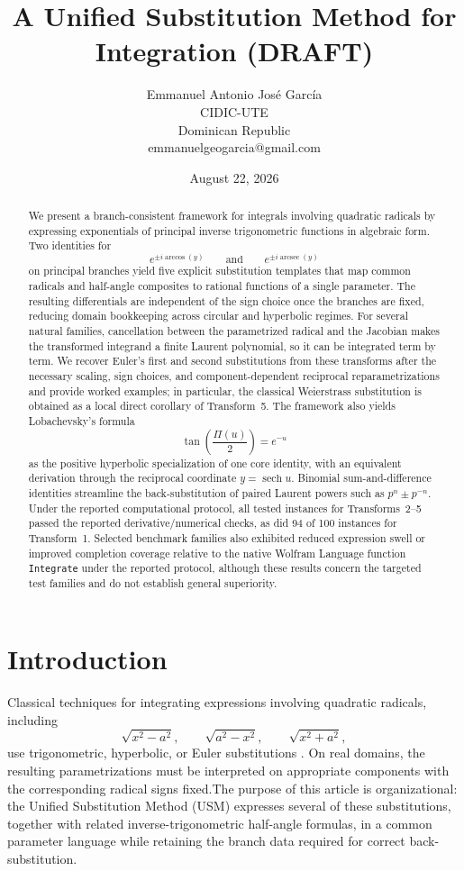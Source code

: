 \documentclass[11pt]{article}
\title{A Unified Substitution Method for Integration (DRAFT)}
\author{Emmanuel Antonio José García\\CIDIC-UTE\\Dominican Republic\\emmanuelgeogarcia@gmail.com}
\date{August 22, 2026}
\theoremstyle{remark}
\DeclareMathOperator{\arcsec}{arcsec}
\DeclareMathOperator{\sech}{sech}
\begin{document}
\maketitle

\begin{abstract}
We present a branch-consistent framework for integrals involving quadratic radicals by expressing exponentials of principal inverse trigonometric functions in algebraic form. Two identities for
\[
e^{\pm i\arccos(y)}
\qquad\text{and}\qquad
e^{\pm i\arcsec(y)}
\]
on principal branches yield five explicit substitution templates that map common radicals and half-angle composites to rational functions of a single parameter. The resulting differentials are independent of the sign choice once the branches are fixed, reducing domain bookkeeping across circular and hyperbolic regimes. For several natural families, cancellation between the parametrized radical and the Jacobian makes the transformed integrand a finite Laurent polynomial, so it can be integrated term by term. We recover Euler's first and second substitutions from these transforms
after the necessary scaling, sign choices, and component-dependent
reciprocal reparametrizations and provide worked examples; in particular,
the classical Weierstrass substitution is obtained as a local direct
corollary of Transform~5. The framework also yields Lobachevsky's formula
\[
\tan\!\left(\frac{\Pi(u)}{2}\right)=e^{-u}
\]
as the positive hyperbolic specialization of one core identity, with an equivalent derivation through the reciprocal coordinate \(y=\sech u\). Binomial sum-and-difference identities streamline the back-substitution of paired Laurent powers such as \(p^n\pm p^{-n}\). Under the reported computational protocol, all tested instances for Transforms~2--5 passed the reported derivative/numerical checks, as did 94 of 100 instances for Transform~1. Selected benchmark families also exhibited reduced expression swell or improved completion coverage relative to the native Wolfram Language function \texttt{Integrate} under the reported protocol, although these results concern the targeted test families and do not establish general superiority.
\end{abstract}

\section{Introduction}

Classical techniques for integrating expressions involving quadratic
radicals, including
\[
\sqrt{x^2-a^2},\qquad \sqrt{a^2-x^2},\qquad \sqrt{x^2+a^2},
\]
use trigonometric, hyperbolic, or Euler substitutions
\cite{Hardy,Kishan,Piskunov}. On real domains, the resulting
parametrizations must be interpreted on appropriate components with
the corresponding radical signs fixed.The purpose of this article is organizational: the Unified Substitution Method (USM) expresses several of these substitutions, together with related inverse-trigonometric half-angle formulas, in a common parameter language while retaining the branch data required for correct back-substitution.
\end{document}
